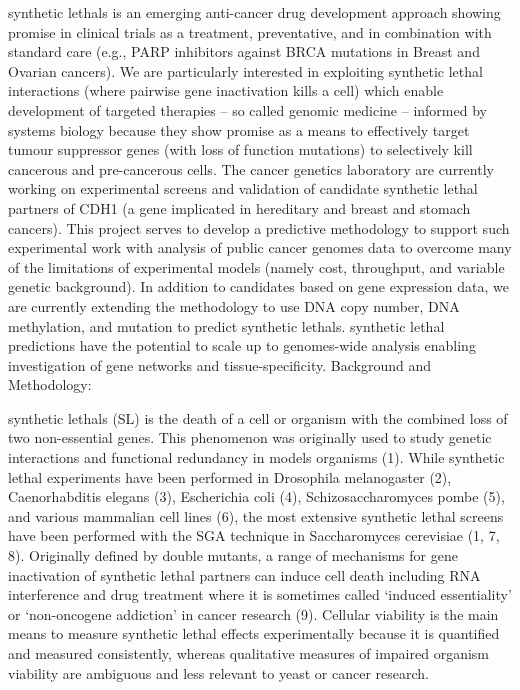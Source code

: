 \Glspl{synthetic lethal} is an emerging anti-cancer drug development approach showing promise in clinical trials as a treatment, preventative, and in combination with standard care (e.g., \gls{PARP} inhibitors against BRCA \glspl{mutation} in Breast and Ovarian cancers). We are particularly interested in exploiting \gls{synthetic lethal} interactions (where pairwise gene inactivation kills a cell) which enable development of targeted therapies – so called genomic medicine – informed by systems biology because they show promise as a means to effectively target \gls{tumour suppressor} genes (with loss of function \glspl{mutation}) to selectively kill cancerous and pre-cancerous cells. The cancer genetics laboratory are currently working on experimental screens and validation of candidate \gls{synthetic lethal} partners of CDH1 (a gene implicated in \gls{hereditary} and  breast and stomach cancers). This project serves to develop a predictive methodology to support such experimental work with analysis of public cancer \glspl{genome} data to overcome many of the limitations of experimental models (namely cost, throughput, and variable genetic background). In addition to candidates based on \gls{gene expression} data, we are currently extending the methodology to use \acrshort{DNA} copy number, \acrshort{DNA} methylation, and  \gls{mutation} to predict \glspl{synthetic lethal}. \Gls{synthetic lethal} predictions have the potential to scale up to \glspl{genome}-wide analysis enabling investigation of gene networks and tissue-specificity.
Background and Methodology:

\Glspl{synthetic lethal} (SL) is the death of a cell or organism with the combined loss of two non-\gls{essential} genes. This phenomenon was originally used to study genetic interactions and \gls{functional redundancy} in models organisms (1). While \gls{synthetic lethal} experiments have been performed in Drosophila melanogaster (2), Caenorhabditis elegans (3), Escherichia coli (4), Schizosaccharomyces pombe (5), and various mammalian cell lines (6), the most extensive \gls{synthetic lethal} screens have been performed with the \gls{SGA} technique in Saccharomyces cerevisiae (1, 7, 8). Originally defined by double \glspl{mutant}, a range of mechanisms for gene inactivation of \gls{synthetic lethal} partners can induce cell death including \acrshort{RNA} interference and drug treatment where it is sometimes called ‘\gls{induced essentiality}’ or ‘\gls{non-oncogene addiction}’ in cancer research (9). Cellular viability is the main means to measure \gls{synthetic lethal} effects experimentally because it is quantified and measured consistently, whereas qualitative measures of impaired organism viability are ambiguous and less relevant to yeast or cancer research.

